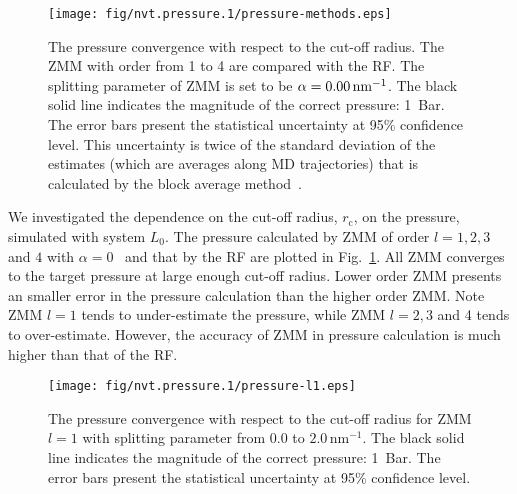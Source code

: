 \documentclass[a4paper,preprint,unsortedaddress,onecolumn,fleqn]{revtex4}
\begin{document}
\begin{figure}[tbp]
\centering
\texttt{[image: fig/nvt.pressure.1/pressure-methods.eps]}
\caption{The pressure convergence with respect to the cut-off radius. The ZMM
  with order from 1 to 4 are compared with the RF. The splitting
parameter of ZMM  is set to be $\protect\alpha =0.00\,\text{nm}^{-1}$.
The black solid line indicates the magnitude of the correct pressure: 1~Bar.
The error bars present the statistical uncertainty at 95\% confidence level. 
{\color{red} This uncertainty is twice of the standard deviation of the
estimates (which are averages along MD trajectories) that is calculated by
the block average method~\protect\cite{janke2002statistical}.}
}
\label{fig:pres-comp}
\end{figure}

We investigated the dependence on the cut-off radius, $r_{\text{c}}$, on the
pressure, simulated with system $L_{0}$. The pressure calculated by ZMM
of order $l=1,2,3$ and $4$ with $\alpha =0$ \ and that by the RF
are plotted in Fig.~\ref{fig:pres-comp}. All ZMM  converges to
the target pressure at large enough cut-off radius. Lower order ZMM presents
an smaller error in the pressure calculation than the higher order ZMM.
Note ZMM $l=1$ tends to under-estimate the pressure, while ZMM $l=2,3$
and 4 tends to over-estimate. However, the accuracy of ZMM in pressure
calculation is much higher than that of the RF.

\begin{figure}[tbp]
\centering
\texttt{[image: fig/nvt.pressure.1/pressure-l1.eps]} %
\caption{ The pressure convergence with respect to the cut-off radius for ZMM
  $l=1$ with splitting parameter from $0.0$ to $2.0\,\text{nm}^{-1}$.
The black solid line indicates the magnitude of the correct pressure: 1~Bar.
The error bars present the statistical uncertainty at 95\% confidence level.}
\label{fig:pres-l1}
\end{figure}
\end{document}
